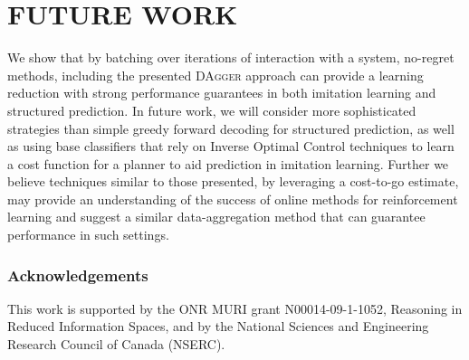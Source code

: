 \documentclass[twoside]{article}
\newcommand{\todo}[1]{\textcolor{red}{[To do: #1]}\index[todo]{#1}}
\begin{document}
\section{FUTURE WORK}
%
We show that by batching over iterations of interaction with a system, no-regret methods, including the presented \textsc{DAgger} approach can provide
a learning reduction with strong performance guarantees in both imitation learning and structured prediction. In future work, we will consider more sophisticated strategies
than simple greedy forward decoding for structured prediction, as well as using base classifiers that rely on Inverse Optimal Control \citep{Abbeel04, Ratliff06} techniques to learn a cost function for a planner to aid prediction in imitation learning.
%
%
Further we believe techniques similar to those presented, by leveraging a cost-to-go estimate, may provide an understanding of the success of online methods for reinforcement
learning and suggest a similar data-aggregation method that can guarantee performance in such settings.
%
%
%
%
\subsubsection*{Acknowledgements}
%
This work is supported by the ONR MURI grant N00014-09-1-1052, Reasoning in Reduced Information Spaces, and by the National Sciences and Engineering Research Council of Canada (NSERC).
%




\end{document}
